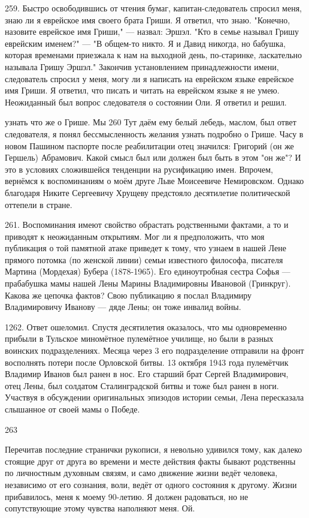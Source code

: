 259. Быстро освободившись от чтения бумаг, капитан-следователь спросил меня, знаю ли я еврейское имя своего брата Гриши. Я ответил, что знаю. "Конечно, назовите еврейское имя Гриши," — назвал: Эршэл. "Кто в семье называл Гришу еврейским именем?" — "В общем-то никто. Я и Давид никогда, но бабушка, которая временами приезжала к нам на выходной день, по-старинке, ласкательно называла Гришу Эршэл." Закончив установлением принадлежности имени, следователь спросил у меня, могу ли я написать на еврейском языке еврейское имя Гриши. Я ответил, что писать и читать на еврейском языке я не умею. Неожиданный был вопрос следователя о состоянии Оли. Я ответил и решил.

узнать что же о Грише. Мы 260 Тут даём ему белый лебедь, маслом, был ответ следователя, я понял бессмысленность желания узнать подробно о Грише. Часу в новом Пашином паспорте после реабилитации отец значился: Григорий (он же Гершель) Абрамович. Какой смысл был или должен был быть в этом "он же"? И это в условиях сложившейся тенденции на русификацию имен. Впрочем, вернёмся к воспоминаниям о моём друге Льве Моисеевиче Немировском. Однако благодаря Никите Сергеевичу Хрущеву предстояло десятилетие политической оттепели в стране.

261. Воспоминания имеют свойство обрастать родственными фактами, а то и приводят к неожиданным открытиям. Мог ли я предположить, что моя публикация о той памятной атаке приведет к тому, что узнаем в нашей Лене прямого потомка (по женской линии) семьи известного философа, писателя Мартина (Мордехая) Бубера (1878-1965). Его единоутробная сестра Софья — прабабушка мамы нашей Лены Марины Владимировны Ивановой (Гринкруг). Какова же цепочка фактов? Свою публикацию я послал Владимиру Владимировичу Иванову — дяде Лены; он тоже инвалид войны.

1262.
Ответ ошеломил. Спустя десятилетия оказалось, что мы одновременно прибыли в Тульское миномётное пулемётное училище, но были в разных воинских подразделениях. Месяца через 3 его подразделение отправили на фронт восполнять потери после Орловской битвы. 13 октября 1943 года пулемётчик Владимир Иванов был ранен в нос. Его старший брат Сергей Владимирович, отец Лены, был солдатом Сталинградской битвы и тоже был ранен в ноги. Участвуя в обсуждении оригинальных эпизодов истории семьи, Лена пересказала слышанное от своей мамы о Победе.

263

Перечитав последние странички рукописи, я невольно удивился тому, как далеко стоящие друг от друга во времени и месте действия факты бывают родственны по личностным духовным связям, и само движение жизни ведёт человека, независимо от его сознания, воли, ведёт от одного состояния к другому. Жизни прибавилось, меня к моему 90-летию. Я должен радоваться, но не сопутствующие этому чувства наполняют меня. Ой.

